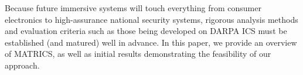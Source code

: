 
Because future immersive systems will touch everything from consumer electronics to high-assurance national security systems, rigorous analysis methods and evaluation criteria such as those being developed on DARPA ICS must be established (and matured) well in advance. In this paper, we provide an overview of MATRICS, as well as initial results demonstrating the feasibility of our approach.

